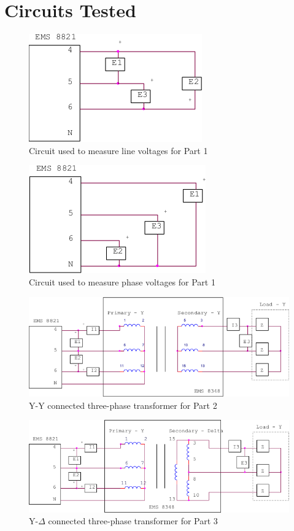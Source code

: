 \documentclass{article}
\begin{document}
\section*{Circuits Tested}
\begin{figure}[H]
  \centering
  \includegraphics[width=.8\textwidth]{img/circuit_01}
  \caption{Circuit used to measure line voltages for Part 1}
  \label{fig:circuit_01}
\end{figure}

\begin{figure}[H]
  \centering
  \includegraphics[width=.8\textwidth]{img/circuit_02}
  \caption{Circuit used to measure phase voltages for Part 1}
  \label{fig:circuit_02}
\end{figure}

\begin{figure}[H]
  \centering
  \includegraphics[width=.8\textwidth]{img/circuit_03}
  \caption{Y-Y connected three-phase transformer for Part 2}
  \label{fig:circuit_03}
\end{figure}

\begin{figure}[H]
  \centering
  \includegraphics[width=.8\textwidth]{img/circuit_04}
  \caption{Y-$\Delta$ connected three-phase transformer for Part 3}
  \label{fig:circuit_04}
\end{figure}
\end{document}
